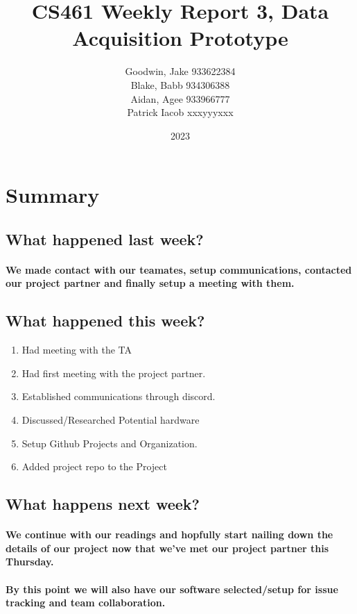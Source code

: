 \documentclass{article}
\title{CS461 Weekly Report 3, Data Acquisition Prototype}
\author{
    Goodwin, Jake
    933622384\\
    Blake, Babb
    934306388\\
    Aidan, Agee
    933966777\\
    Patrick Iacob
    xxxyyyxxx\\
}
\date{2023}
\begin{document}
\maketitle

\section{Summary}


\subsection{What happened last week?}
\paragraph{
We made contact with our teamates, setup communications, contacted our project
partner and finally setup a meeting with them.
}

\subsection{What happened this week?}

\begin{enumerate}
        \item   Had meeting with the TA
        \item   Had first meeting with the project partner.
        \item   Established communications through discord.
        \item   Discussed/Researched Potential hardware
        \item   Setup Github Projects and Organization.
        \item   Added project repo to the Project
\end{enumerate}


\subsection{What happens next week?}
\paragraph{
We continue with our readings and hopfully start nailing down the details
of our project now that we've met our project partner this Thursday.
}

\paragraph{
    By this point we will also have our software selected/setup for issue tracking
    and team collaboration.
}
\end{document}
